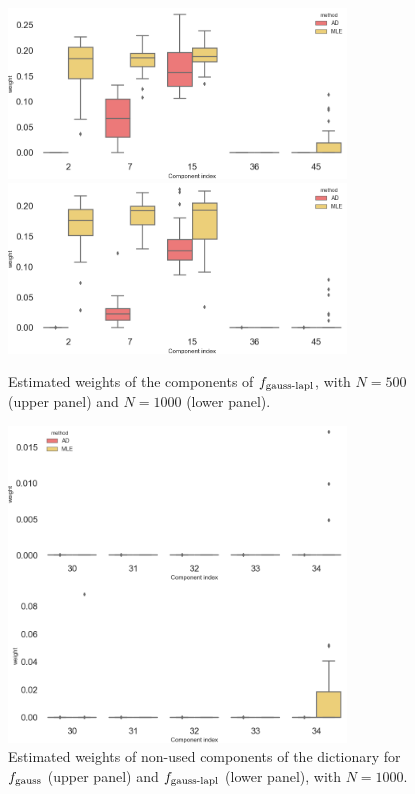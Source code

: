 \begin{figure}
\center
    \includegraphics[width=0.8\textwidth]{./TeX_files/weight_f_gauss_laplace_real_comp_N_500.png}
    \includegraphics[width=0.8\textwidth]{./TeX_files/weight_f_gauss_laplace_real_comp_N_1000.png}
    \caption{Estimated weights of the components of $f_{\textnormal{gauss-lapl}}$, with $N=500$ (upper panel) and $N=1000$
    (lower panel).}
    \label{fig:weights_gauss_laplace_real_indexes}
\end{figure}
\begin{figure}
\center
    \includegraphics[width=0.8\textwidth]{./TeX_files/weight_f_gauss_and_laplace_other_comp_N_1000.png}
    \caption{Estimated weights of non-used components of the dictionary for  $f_{\textnormal{gauss}}$ (upper panel) and $f_{\textnormal{gauss-lapl}}$ (lower panel), with $N=1000$.}
    \label{fig:weights_gauss_and_laplace_other_indexes}
\end{figure}

